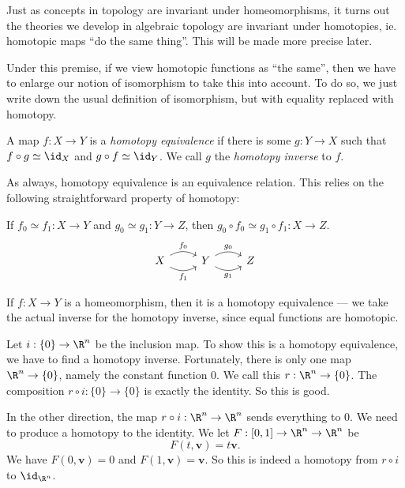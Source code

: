 \documentclass[a4paper]{article}
\begin{document}
Just as concepts in topology are invariant under homeomorphisms, it turns out the theories we develop in algebraic topology are invariant under homotopies, ie. homotopic maps ``do the same thing''. This will be made more precise later.

Under this premise, if we view homotopic functions as ``the same'', then we have to enlarge our notion of isomorphism to take this into account. To do so, we just write down the usual definition of isomorphism, but with equality replaced with homotopy.

\begin{defi}
  A map $f: X \to Y$ is a \emph{homotopy equivalence} if there is some $g: Y \to X$ such that $f \circ g \simeq \id_X$ and $g \circ f \simeq \id_Y$. We call $g$ the \emph{homotopy inverse} to $f$.
\end{defi}
As always, homotopy equivalence is an equivalence relation. This relies on the following straightforward property of homotopy:

\begin{prop}
  If $f_0 \simeq f_1: X \to Y$ and $g_0 \simeq g_1: Y \to Z$, then $g_0 \circ f_0 \simeq g_1 \circ f_1: X \to Z$.
  \[
    \begin{tikzcd}
      X \ar[r, bend left, "f_0"] \ar[r, bend right, "f_1"'] & Y \ar[r, bend left, "g_0"] \ar[r, bend right, "g_1"'] & Z
    \end{tikzcd}
  \]
\end{prop}

\begin{eg}
  If $f: X \to Y$ is a homeomorphism, then it is a homotopy equivalence --- we take the actual inverse for the homotopy inverse, since equal functions are homotopic.
\end{eg}

\begin{eg}
  Let $i: \{0\} \to \R^n$ be the inclusion map. To show this is a homotopy equivalence, we have to find a homotopy inverse. Fortunately, there is only one map $\R^n \to \{0\}$, namely the constant function $0$. We call this $r: \R^n \to \{0\}$. The composition $r \circ i: \{0\} \to \{0\}$ is exactly the identity. So this is good.

  In the other direction, the map $r \circ i: \R^n \to \R^n$ sends everything to $0$. We need to produce a homotopy to the identity. We let $F: [0, 1] \to \R^n \to \R^n$ be
  \[
    F(t, \mathbf{v}) = t\mathbf{v}.
  \]
  We have $F(0, \mathbf{v}) = 0$ and $F(1, \mathbf{v}) = \mathbf{v}$. So this is indeed a homotopy from $r \circ i$ to $\id_{\R^n}$.
\end{eg}
\end{document}
